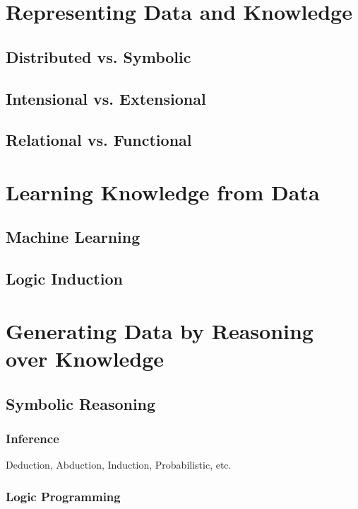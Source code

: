 \documentclass[12pt,a4paper,openright,twoside]{book}
\begin{document}
\cite{xailp-woa2019}
\cite{xaisurvey-ia14}

\chapter{Representing Data and Knowledge}

\section{Distributed vs. Symbolic}

\section{Intensional vs. Extensional}

\section{Relational vs. Functional}

\chapter{Learning Knowledge from Data}

\section{Machine Learning}

\section{Logic Induction}

\chapter{Generating Data by Reasoning over Knowledge}

\section{Symbolic Reasoning}

\subsection{Inference}

Deduction, Abduction, Induction, Probabilistic, etc.

\subsection{Logic Programming}
\end{document}
